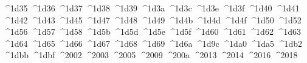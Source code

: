 {  ^^^^1d35%
  ^^^^1d36%
  ^^^^1d37%
  ^^^^1d38%
  ^^^^1d39%
  ^^^^1d3a%
  ^^^^1d3c%
  ^^^^1d3e%
  ^^^^1d3f%
  ^^^^1d40%
  ^^^^1d41%
  ^^^^1d42%
  ^^^^1d43%
  ^^^^1d45%
  ^^^^1d47%
  ^^^^1d48%
  ^^^^1d49%
  ^^^^1d4b%
  ^^^^1d4d%
  ^^^^1d4f%
  ^^^^1d50%
  ^^^^1d52%
  ^^^^1d56%
  ^^^^1d57%
  ^^^^1d58%
  ^^^^1d5b%
  ^^^^1d5d%
  ^^^^1d5e%
  ^^^^1d5f%
  ^^^^1d60%
  ^^^^1d61%
  ^^^^1d62%
  ^^^^1d63%
  ^^^^1d64%
  ^^^^1d65%
  ^^^^1d66%
  ^^^^1d67%
  ^^^^1d68%
  ^^^^1d69%
  ^^^^1d6a%
  ^^^^1d9c%
  ^^^^1da0%
  ^^^^1da5%
  ^^^^1db2%
  ^^^^1dbb%
  ^^^^1dbf%
  ^^^^2002%
  ^^^^2003%
  ^^^^2005%
  ^^^^2009%
  ^^^^200a%
  ^^^^2013%
  ^^^^2014%
  ^^^^2016%
  ^^^^2018%
}
